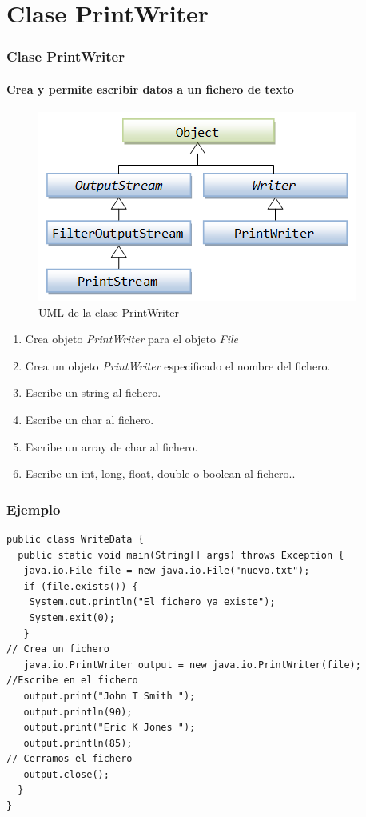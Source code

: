 \documentclass{beamer}
\begin{document}
\section{Clase PrintWriter}
\begin{frame}
\frametitle{Clase PrintWriter}
\framesubtitle{Crea y permite escribir datos a un fichero de texto}
\pause
\begin{multicols}{2}
\begin{figure}
\includegraphics[scale=0.55]{imagenes/pw.png} 
\caption{UML de la clase PrintWriter}
\end{figure} 
\begin{small}
\begin{enumerate}[<+-| alert@+>]
      \item Crea objeto \emph{PrintWriter} para el objeto \emph{File}
      \item Crea un objeto \emph{PrintWriter} especificado el nombre del fichero.
      \item Escribe un string al fichero.
      \item Escribe un char al fichero.
      \item Escribe un array de char al fichero.
      \item Escribe un int, long, float, double o boolean al fichero..
      \end{enumerate}
\end{small}
\end{multicols}
\pause
  
\end{frame}


\begin{frame}[fragile]
\frametitle{Ejemplo}
\begin{small}
\begin{verbatim}
public class WriteData {
  public static void main(String[] args) throws Exception {
   java.io.File file = new java.io.File("nuevo.txt");
   if (file.exists()) {
    System.out.println("El fichero ya existe");
    System.exit(0);
   }
// Crea un fichero
   java.io.PrintWriter output = new java.io.PrintWriter(file);
//Escribe en el fichero
   output.print("John T Smith ");
   output.println(90);
   output.print("Eric K Jones ");
   output.println(85);
// Cerramos el fichero
   output.close();
  }
}
\end{verbatim}
\end{small}
\end{frame}
\end{document}
